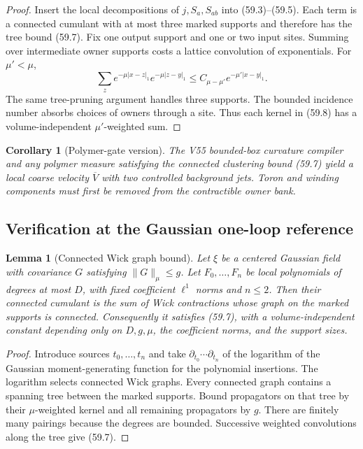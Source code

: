 \documentclass[11pt,oneside]{book}
\newtheorem{lemma}[theorem]{Lemma}
\newtheorem{corollary}[theorem]{Corollary}
\theoremstyle{definition}
\theoremstyle{remark}
\begin{document}
\begin{proof}
Insert the local decompositions of \(j,S_a,S_{ab}\) into
(59.3)--(59.5).  Each term is a connected cumulant with at most
three marked supports and therefore has the tree bound (59.7).
Fix one output support and one or two input sites.  Summing over
intermediate owner supports costs a lattice convolution of
exponentials.  For \(\mu'<\mu\),
\[
 \sum_z e^{-\mu|x-z|_1}e^{-\mu|z-y|_1}
 \le C_{\mu-\mu'}e^{-\mu'|x-y|_1}.                           \tag{59.9}
\]
The same tree-pruning argument handles three supports.  The
bounded incidence number absorbs choices of owners through a
site.  Thus each kernel in (59.8) has a volume-independent
\(\mu'\)-weighted sum.
\end{proof}

\begin{corollary}[Polymer-gate version]
\label{cor:e8v59-polymer-current}
The V55 bounded-box curvature compiler and any polymer measure
satisfying the connected clustering bound (59.7) yield a local
coarse velocity \(\overline V\) with two controlled background
jets.  Toron and winding components must first be removed from the
contractible owner bank.
\end{corollary}

\subsection{Verification at the Gaussian one-loop reference}

\begin{lemma}[Connected Wick graph bound]
\label{lem:e8v59-Wick-bound}
Let \(\xi\) be a centered Gaussian field with covariance \(G\)
satisfying \(\|G\|_\mu\le g\).  Let
\(F_0,\ldots,F_n\) be local polynomials of degrees at most \(D\),
with fixed coefficient \(\ell^1\) norms and \(n\le2\).  Then their
connected cumulant is the sum of Wick contractions whose graph on
the marked supports is connected.  Consequently it satisfies
(59.7), with a volume-independent constant depending only on
\(D,g,\mu\), the coefficient norms, and the support sizes.
\end{lemma}

\begin{proof}
Introduce sources \(t_0,\ldots,t_n\) and take
\(\partial_{t_0}\cdots\partial_{t_n}\) of the logarithm of the
Gaussian moment-generating function for the polynomial
insertions.  The logarithm selects connected Wick graphs.  Every
connected graph contains a spanning tree between the marked
supports.  Bound propagators on that tree by their
\(\mu\)-weighted kernel and all remaining propagators by \(g\).
There are finitely many pairings because the degrees are bounded.
Successive weighted convolutions along the tree give (59.7).
\end{proof}
\end{document}
